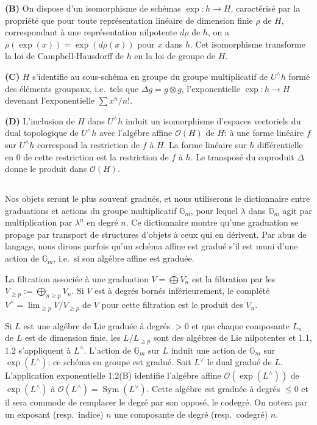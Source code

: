 \documentclass[11pt,a4paper]{article}
\theoremstyle{plain}
\theoremstyle{definition}
\DeclareMathOperator{\Sym}{Sym}
\newcommand{\Gm}{\mathbb{G}_m}
\begin{document}
\textbf{(B)} On dispose d'un isomorphisme de sch\'emas $\exp: h \to H$, caract\'eris\'e par la propri\'et\'e que pour toute repr\'esentation lin\'eaire de dimension finie $\rho$ de $H$, correspondant \`a une repr\'esentation nilpotente $d\rho$ de $h$, on a $\rho(\exp(x)) = \exp(d\rho(x))$ pour $x$ dans $h$. Cet isomorphisme transforme la loi de Campbell-Hausdorff de $h$ en la loi de groupe de $H$.

\textbf{(C)} $H$ s'identifie au sous-sch\'ema en groupe du groupe multiplicatif de $U^{\wedge}h$ form\'e des \'el\'ements groupaux, i.e.~tels que $\Delta g = g \otimes g$, l'exponentielle $\exp: h \to H$ devenant l'exponentielle $\sum x^n/n!$.

\textbf{(D)} L'inclusion de $H$ dans $U^{\wedge}h$ induit un isomorphisme d'espaces vectoriels du dual topologique de $U^{\wedge}h$ avec l'alg\'ebre affine $\mathcal{O}(H)$ de $H$: \`a une forme lin\'eaire $f$ sur $U^{\wedge}h$ correspond la restriction de $f$ \`a $H$. La forme lin\'eaire sur $h$ diff\'erentielle en $0$ de cette restriction est la restriction de $f$ \`a $h$. Le transpos\'e du coproduit $\Delta$ donne le produit dans $\mathcal{O}(H)$.

\subsection{}
Nos objets seront le plus souvent gradu\'es, et nous utiliserons le dictionnaire entre graduations et actions du groupe multiplicatif $\Gm$, pour lequel $\lambda$ dans $\Gm$ agit par multiplication par $\lambda^n$ en degr\'e $n$. Ce dictionnaire montre qu'une graduation se propage par transport de structures d'objets \`a ceux qui en d\'erivent. Par abus de langage, nous dirons parfois qu'un sch\'ema affine est gradu\'e s'il est muni d'une action de $\Gm$, i.e.~si son alg\'ebre affine est gradu\'ee.

La filtration associ\'ee \`a une graduation $V = \bigoplus V_n$ est la filtration par les $V_{\geq p} := \bigoplus_{n \geq p} V_n$. Si $V$ est \`a degr\'es born\'es inf\'erieurement, le compl\'et\'e $V^{\wedge} = \lim_{\geq p} V/V_{\geq p}$ de $V$ pour cette filtration est le produit des $V_n$.

Si $L$ est une alg\'ebre de Lie gradu\'ee \`a degr\'es $> 0$ et que chaque composante $L_n$ de $L$ est de dimension finie, les $L/L_{\geq p}$ sont des alg\'ebres de Lie nilpotentes et 1.1, 1.2 s'appliquent \`a $L^{\wedge}$. L'action de $\Gm$ sur $L$ induit une action de $\Gm$ sur $\exp(L^{\wedge})$: ce sch\'ema en groupe est gradu\'e. Soit $L^{\vee}$ le dual gradu\'e de $L$. L'application exponentielle 1.2(B) identifie l'alg\'ebre affine $\mathcal{O}(\exp(L^{\wedge}))$ de $\exp(L^{\wedge})$ \`a $\mathcal{O}(L^{\wedge}) = \Sym(L^{\vee})$. Cette alg\'ebre est gradu\'ee \`a degr\'es $\leq 0$ et il sera commode de remplacer le degr\'e par son oppos\'e, le codegr\'e. On notera par un exposant (resp.~indice) $n$ une composante de degr\'e (resp.~codegr\'e) $n$.
\end{document}
